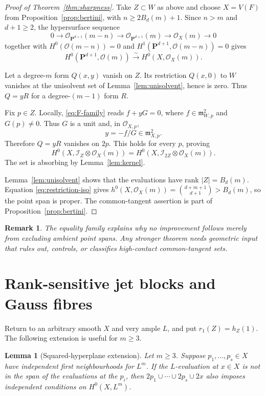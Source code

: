 \documentclass[11pt]{article}
\newtheorem{lemma}[theorem]{Lemma}
\newtheorem{remark}[theorem]{Remark}
\newcommand{\PP}{\mathbf P}
\newcommand{\cI}{\mathcal I}
\newcommand{\cO}{\mathcal O}
\newcommand{\BZ}{B_d(m)}
\begin{document}
\begin{proof}[Proof of Theorem~\ref{thm:sharpness}]
Take $Z\subset W$ as above and choose $X=V(F)$ from
Proposition~\ref{prop:bertini}, with $n\geq2\BZ+1$.  Since $n>m$ and
$d+1\geq2$, the hypersurface sequence
\[
0\longrightarrow\cO_{\PP^{d+1}}(m-n)
\longrightarrow\cO_{\PP^{d+1}}(m)
\longrightarrow\cO_X(m)\longrightarrow0
\]
together with $H^0(\cO(m-n))=0$ and
$H^1(\PP^{d+1},\cO(m-n))=0$ gives
\begin{equation}\label{eq:restriction-iso}
 H^0(\PP^{d+1},\cO(m))\xrightarrow{\ \sim\ }H^0(X,\cO_X(m)).
\end{equation}

Let a degree-$m$ form $Q(x,y)$ vanish on $Z$.  Its restriction $Q(x,0)$ to
$W$ vanishes at the unisolvent set of Lemma~\ref{lem:unisolvent}, hence is
zero.  Thus $Q=yR$ for a degree-$(m-1)$ form $R$.

Fix $p\in Z$.  Locally, \eqref{eq:F-family} reads $f+yG=0$, where
$f\in\mathfrak m_{W,p}^2$ and $G(p)\neq0$.  Thus $G$ is a unit and, in
$\cO_{X,p}$,
\[
 y=-f/G\in\mathfrak m_{X,p}^2.
\]
Therefore $Q=yR$ vanishes on $2p$.  This holds for every $p$, proving
\[
 H^0(X,\cI_Z\otimes\cO_X(m))
 =H^0(X,\cI_{2Z}\otimes\cO_X(m)).
\]
The set is absorbing by Lemma~\ref{lem:kernel}.

Lemma~\ref{lem:unisolvent} shows that the evaluations have rank
$|Z|=\BZ$.  Equation \eqref{eq:restriction-iso} gives
$h^0(X,\cO_X(m))=\binom{d+m+1}{d+1}>\BZ$, so the point span is proper.  The
common-tangent assertion is part of Proposition~\ref{prop:bertini}.
\end{proof}

\begin{remark}
The equality family explains why no improvement follows merely from
excluding ambient point spans.  Any stronger theorem needs geometric input
that rules out, controls, or classifies high-contact common-tangent sets.
\end{remark}

\section{Rank-sensitive jet blocks and Gauss fibres}\label{sec:rank-sensitive}

Return to an arbitrary smooth $X$ and very ample $L$, and put
$r_1(Z)=h_Z(1)$.  The following extension is useful for $m\geq3$.

\begin{lemma}[Squared-hyperplane extension]\label{lem:block-extension}
Let $m\geq3$.  Suppose $p_1,\ldots,p_s\in X$ have independent first
neighbourhoods for $L^m$.  If the $L$-evaluation at $x\in X$ is not in the
span of the evaluations at the $p_i$, then
$2p_1\cup\cdots\cup2p_s\cup2x$ also imposes independent conditions on
$H^0(X,L^m)$.
\end{lemma}
\end{document}
